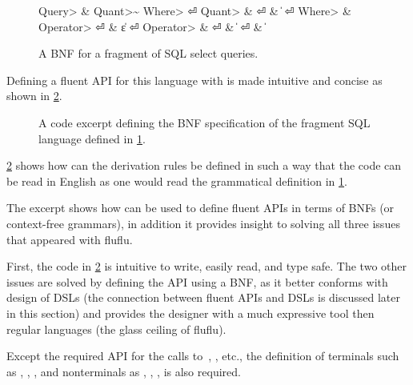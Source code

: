 \begin{figure}[ht]
  \caption{\label{figure:sql-bnf}
    A BNF for a fragment of SQL select queries.
  }
  \begin{Grammar}
    \begin{aligned}
      \<Query> & \Derives {} \<Quant>\~ \<Where> \hfill⏎
      \<Quant> & \Derives {} \hfill⏎
               & \|  \hfill⏎
      \<Where> & \Derives {}  \<Operator> \hfill⏎
          & \|ε \hfill⏎
      \<Operator> & \Derives {}\hfill⏎
          & \|  \hfill⏎
          & \| \hfill
    \end{aligned}
  \end{Grammar}
\end{figure}

Defining a fluent API for this language with \Fajita is made
intuitive and concise as shown in \cref{figure:sql-bnf-java}.

\begin{figure}[ht]
  \caption{\label{figure:sql-bnf-java}
    A \Java code excerpt defining the BNF specification of the fragment SQL
    language defined in \cref{figure:sql-bnf}.}
\end{figure}

\cref{figure:sql-bnf-java} shows how can the derivation rules be defined in
such a way that the code can be read in English as one would read the
grammatical definition in \cref{figure:sql-bnf}.

The excerpt shows how can \Fajita be used to define fluent
  APIs in terms of BNFs (or context-free grammars), in addition it provides
  insight to solving all three issues that appeared with fluflu.

First, the code in \cref{figure:sql-bnf-java} is intuitive to write, easily
read, and type safe. The two other issues are solved by defining the API using
a BNF, as it better conforms with design of DSLs (the connection between fluent
APIs and DSLs is discussed later in this section) and provides the designer
with a much expressive tool then regular languages (the glass ceiling of
fluflu).

Except the required API for the calls to~,
  ,  etc., the definition of terminals such as
  , , , and nonterminals as ,
  , , is also required.

